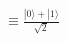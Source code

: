 \documentclass[preview]{standalone}
\begin{document}
\begin{align*}
\equiv \frac{|0\rangle + |1\rangle}{\sqrt{2}}
\end{align*}
\end{document}
